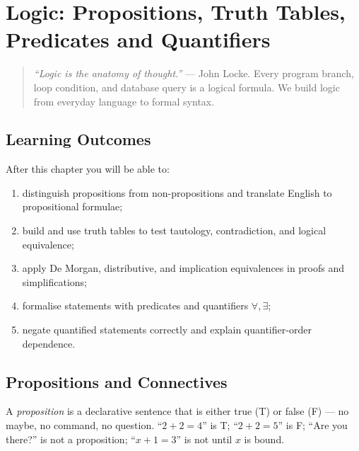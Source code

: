 \chapter[Logic]{Logic: Propositions, Truth Tables, Predicates and Quantifiers}
\label{ch:logic}

\begin{quote}
\emph{``Logic is the anatomy of thought.''} --- John Locke. Every program branch, loop condition, and database query is a logical formula. We build logic from everyday language to formal syntax.
\end{quote}

\noindent{}
\vspace{0.4em}

\section*{Learning Outcomes}
After this chapter you will be able to:
\begin{enumerate}[label=(L\arabic*)]
    \item distinguish propositions from non-propositions and translate English to propositional formulae;
    \item build and use truth tables to test tautology, contradiction, and logical equivalence;
    \item apply De Morgan, distributive, and implication equivalences in proofs and simplifications;
    \item formalise statements with predicates and quantifiers $\forall,\exists$;
    \item negate quantified statements correctly and explain quantifier-order dependence.
\end{enumerate}

\section{Propositions and Connectives}
\label{sec:propositions}
A \emph{proposition} is a declarative sentence that is either true (T) or false (F) --- no maybe, no command, no question. ``$2+2=4$'' is T; ``$2+2=5$'' is F; ``Are you there?'' is not a proposition; ``$x+1=3$'' is not until $x$ is bound.

